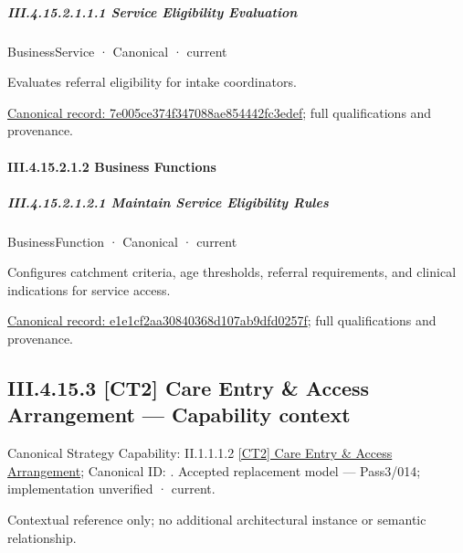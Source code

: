 \subparagraph*{III.4.15.2.1.1.1 Service Eligibility Evaluation}
\label{navigation:III.4.15.2.1.1.1}

\label{element:7e005ce374f347088ae854442fc3edef}
{\small BusinessService · Canonical · current}\par

Evaluates referral eligibility for intake coordinators.


{\footnotesize \href{../../../../../../../../continuum/business/business-service/7e005ce374f347088ae854442fc3edef.md}{Canonical record: 7e005ce374f347088ae854442fc3edef}; full qualifications and provenance.}\par
\paragraph*{III.4.15.2.1.2 Business Functions}
\label{navigation:III.4.15.2.1.2}

\subparagraph*{III.4.15.2.1.2.1 Maintain Service Eligibility Rules}
\label{navigation:III.4.15.2.1.2.1}

\label{element:e1e1cf2aa30840368d107ab9dfd0257f}
{\small BusinessFunction · Canonical · current}\par

Configures catchment criteria, age thresholds, referral requirements, and clinical indications for service access.


{\footnotesize \href{../../../../../../../../continuum/business/business-function/e1e1cf2aa30840368d107ab9dfd0257f.md}{Canonical record: e1e1cf2aa30840368d107ab9dfd0257f}; full qualifications and provenance.}\par
\subsection*{III.4.15.3 [CT2] Care Entry \& Access Arrangement — Capability context}
\label{navigation:III.4.15.3}

{\small Canonical Strategy Capability: II.1.1.1.2 \hyperref[element:199f8d09f6304730a17cfe6ce79a9282]{[CT2] Care Entry \& Access Arrangement}; Canonical ID: \texttt{}. Accepted replacement model — Pass3/014; implementation unverified · current.}\par
Contextual reference only; no additional architectural instance or semantic relationship.\par
